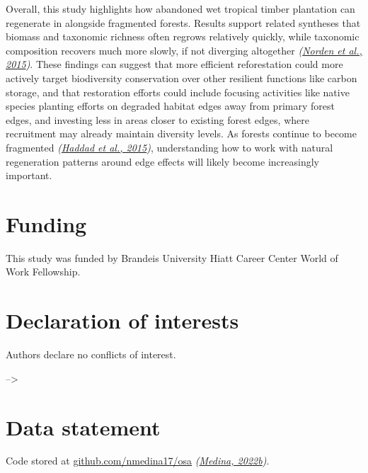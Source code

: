 \documentclass[
  12pt,
]{article}
\begin{document}
Overall, this study highlights how abandoned wet tropical timber plantation can regenerate in alongside fragmented forests.
Results support related syntheses that biomass and taxonomic richness often regrows relatively quickly,
while taxonomic composition recovers much more slowly, if not diverging altogether \emph{(\protect\hyperlink{ref-norden15}{Norden et al., 2015})}.
These findings can suggest that more efficient reforestation could more actively target biodiversity conservation over other resilient functions like carbon storage, and that restoration efforts could include focusing activities like native species planting efforts on degraded habitat edges away from primary forest edges, and investing less in areas closer to existing forest edges, where recruitment may already maintain diversity levels.
As forests continue to become fragmented \emph{(\protect\hyperlink{ref-haddad15}{Haddad et al., 2015})}, understanding how to work with natural regeneration patterns around edge effects will likely become increasingly important.

\newpage

\hypertarget{funding}{%
\section*{Funding}\label{funding}}

This study was funded by Brandeis University Hiatt Career Center World of Work Fellowship.

\hypertarget{declaration-of-interests}{%
\section*{Declaration of interests}\label{declaration-of-interests}}

Authors declare no conflicts of interest.

--\textgreater{}

\hypertarget{data-statement}{%
\section*{Data statement}\label{data-statement}}

Code stored at \href{github.com/nmedin17/osa}{github.com/nmedina17/osa} \emph{(\protect\hyperlink{ref-softwareMedina22osa}{Medina, 2022b})}.

\newpage
\end{document}
